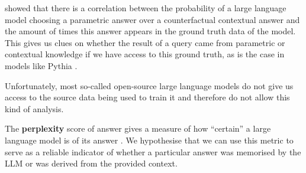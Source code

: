  showed that there is a correlation between the probability of a large language model choosing a parametric answer over a counterfactual contextual answer and the amount of times this answer appears in the ground truth data of the model.
This gives us clues on whether the result of a query came from parametric or contextual knowledge if we have access to this ground truth, as is the case in models like Pythia \citep{pythia}.

Unfortunately, most so-called open-source large language models do not give us access to the source data being used to train it and therefore do not allow this kind of analysis.

The \textbf{perplexity} score of answer gives a measure of how ``certain'' a large language model is of its answer \citep{how_can_we_know}.
We hypothesise that we can use this metric to serve as a reliable indicator of whether a particular answer was memorised by the LLM or was derived from the provided context.
